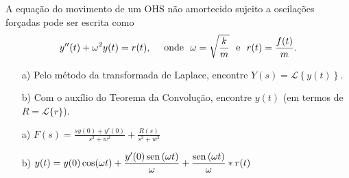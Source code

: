 \begin{exer}
A equação do movimento de um OHS não amortecido sujeito a oscilações forçadas pode ser escrita como
\begin{equation}
y''(t) + \omega^2 y(t) = r(t), \quad \hbox{ onde } \ \omega= \sqrt{\frac{k}{m}} \ \hbox{ e } \ r(t) = \frac{f(t)}{m}.
\end{equation}
\begin{itemize}
  \item[a)] Pelo método da transformada de Laplace, encontre $Y(s) = \mathcal{L} \left\{y(t)\right\}$.
  \item[b)] Com o auxílio do Teorema da Convolução, encontre $y(t)$ (em termos de $R = \mathcal{L}\{r\}$).
\end{itemize}
\end{exer}
\begin{resp}
\begin{itemize}
   \item[a)] $\displaystyle F(s) = \frac{sy(0)+y'(0)}{s^2 + w^2} + \frac{R(s)}{s^2 + w^2}$
  \item[b)] $\displaystyle y(t) = y(0) \cos (\omega t) + \frac{y'(0) \operatorname{sen}\, (\omega t)}{\omega} + \frac{\operatorname{sen}\, (\omega t)}{\omega} \ast r(t)$
\end{itemize}
\end{resp}



